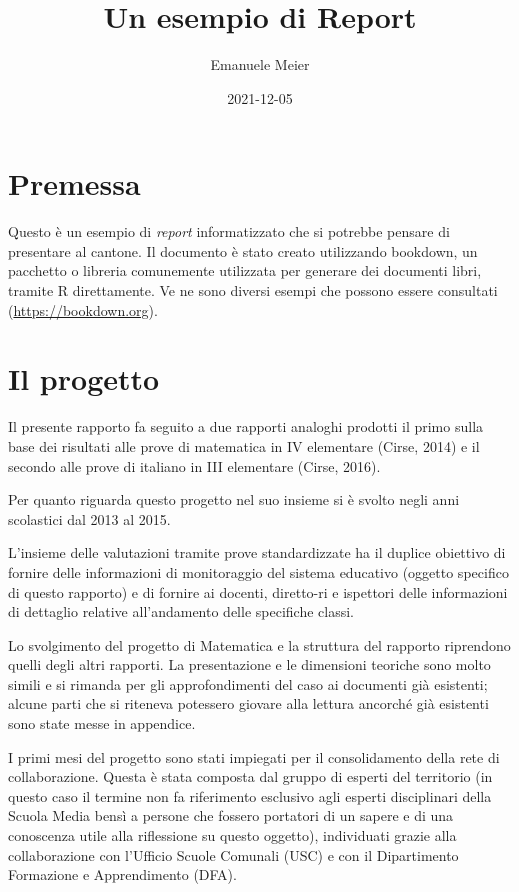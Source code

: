 \documentclass[
]{book}
\title{Un esempio di Report}
\author{Emanuele Meier}
\date{2021-12-05}
\begin{document}
\maketitle

{
\setcounter{tocdepth}{1}
\tableofcontents
}
\hypertarget{premessa}{%
\chapter{Premessa}\label{premessa}}

Questo è un esempio di \emph{report} informatizzato che si potrebbe pensare di presentare al cantone. Il documento è stato creato utilizzando bookdown, un pacchetto o libreria comunemente utilizzata per generare dei documenti libri, tramite R direttamente. Ve ne sono diversi esempi che possono essere consultati (\url{https://bookdown.org}).

\hypertarget{intro}{%
\chapter{Il progetto}\label{intro}}

Il presente rapporto fa seguito a due rapporti analoghi prodotti il primo sulla base dei risultati alle prove di matematica in IV elementare (Cirse, 2014) e il secondo alle prove di italiano in III elementare (Cirse, 2016).

Per quanto riguarda questo progetto nel suo insieme si è svolto negli anni scolastici dal 2013 al 2015.

L'insieme delle valutazioni tramite prove standardizzate ha il duplice obiettivo di fornire delle informazioni di monitoraggio del sistema educativo (oggetto specifico di questo rapporto) e di fornire ai docenti, diretto-ri e ispettori delle informazioni di dettaglio relative all'andamento delle specifiche classi.

Lo svolgimento del progetto di Matematica e la struttura del rapporto riprendono quelli degli altri rapporti. La presentazione e le dimensioni teoriche sono molto simili e si rimanda per gli approfondimenti del caso ai documenti già esistenti; alcune parti che si riteneva potessero giovare alla lettura ancorché già esistenti sono state messe in appendice.

I primi mesi del progetto sono stati impiegati per il consolidamento della rete di collaborazione. Questa è stata composta dal gruppo di esperti del territorio (in questo caso il termine non fa riferimento esclusivo agli esperti disciplinari della Scuola Media bensì a persone che fossero portatori di un sapere e di una conoscenza utile alla riflessione su questo oggetto), individuati grazie alla collaborazione con l'Ufficio Scuole Comunali (USC) e con il Dipartimento Formazione e Apprendimento (DFA).
\end{document}
